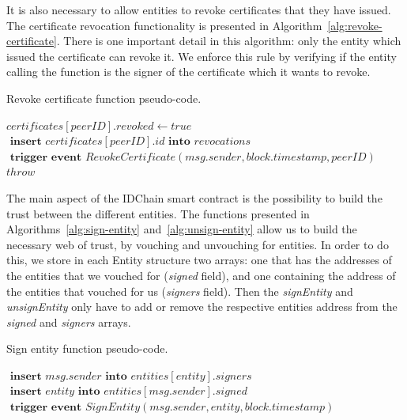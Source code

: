 It is also necessary to allow entities to revoke certificates that they have issued.
The certificate revocation functionality is presented in Algorithm~\ref{alg:revoke-certificate}.
There is one important detail in this algorithm: only the entity which issued the certificate can revoke it.
We enforce this rule by verifying if the entity calling the function is the signer of the certificate which it wants to revoke.

\begin{algorithm}[h!]
  \caption{Revoke certificate function pseudo-code.}
  \label{alg:revoke-certificate}
  \begin{algorithmic}[1]
        \State $certificates[peerID].revoked \gets true$
        \State $\textbf{ insert } certificates[peerID].id \textbf{ into } revocations$
        \State $\textbf{ trigger event } RevokeCertificate(msg.sender, block.timestamp, peerID)$
      \Else
        \State $throw$
      \EndIf
    \EndFunction
  \end{algorithmic}
\end{algorithm}



The main aspect of the IDChain smart contract is the possibility to build the trust between the different entities.
The functions presented in Algorithms~\ref{alg:sign-entity} and~\ref{alg:unsign-entity} allow us to build the necessary web of trust, by vouching and unvouching for entities.
In order to do this, we store in each Entity structure two arrays: one that has the addresses of the entities that we vouched for (\textit{signed} field), and one containing the address of the entities that vouched for us (\textit{signers} field).
Then the \textit{signEntity} and \textit{unsignEntity} only have to add or remove the respective entities address from the \textit{signed} and \textit{signers} arrays.

\begin{algorithm}[h!]
  \caption{Sign entity function pseudo-code.}
  \label{alg:sign-entity}
  \begin{algorithmic}[1]
      \State $\textbf{ insert } msg.sender \textbf{ into } entities[entity].signers$
      \State $\textbf{ insert } entity \textbf{ into } entities[msg.sender].signed$
      \State $\textbf{ trigger event } SignEntity(msg.sender, entity, block.timestamp)$
      \State {}
    \EndFunction
  \end{algorithmic}
\end{algorithm}


